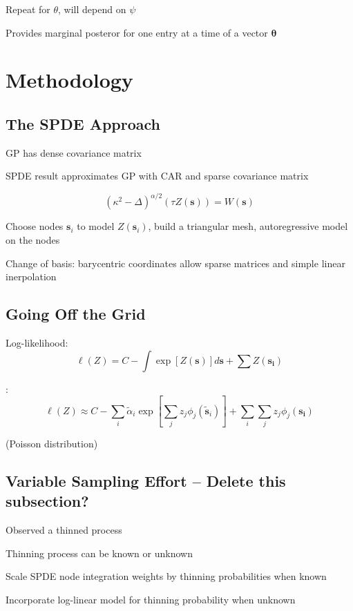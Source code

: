 \documentclass[]{interact}
\begin{document}
Repeat for $\theta$, will depend on $\psi$

Provides marginal posteror for one entry at a time of a vector $\boldsymbol{\theta}$



\section{Methodology}
\subsection{The SPDE Approach}

GP has dense covariance matrix

SPDE result approximates GP with CAR and sparse covariance matrix \cite{lindgrenetal}

$$(\kappa^{2} - \Delta)^{\alpha / 2} (\tau Z(\mathbf{s})) = W(\mathbf{s})$$

Choose nodes $\mathbf{s}_{i}$ to model $Z(\mathbf{s}_{i})$, build a triangular mesh, autoregressive model on the nodes

Change of basis: barycentric coordinates allow sparse matrices and simple linear inerpolation


\subsection{Going Off the Grid}

Log-likelihood:
$$\ell(Z) = C - \int \exp\left[Z(\mathbf{s})\right] d\mathbf{s} + \sum Z(\mathbf{s_{i}})$$

\cite{simpsonetal}:
$$\ell(Z) \approx C - \sum_{i} \tilde{\alpha}_{i} \exp\left[\sum_{j} z_{j}\phi_{j}(\tilde{\mathbf{s}}_{i})\right] + \sum_{i} \sum_{j} z_{j}\phi_{j}(\mathbf{s_{i}})$$

(Poisson distribution)


\subsection{Variable Sampling Effort -- Delete this subsection?}

Observed a thinned process

Thinning process can be known or unknown

Scale SPDE node integration weights by thinning probabilities when known

Incorporate log-linear model for thinning probability when unknown \cite{yuanetal}
\end{document}
